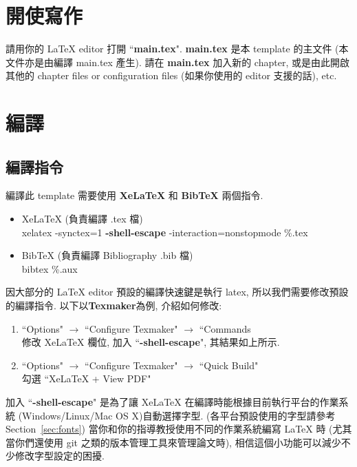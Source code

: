 \section{開使寫作}

請用你的 LaTeX editor 打開 ``\textbf{main.tex}".
\textbf{main.tex} 是本 template 的主文件 (本文件亦是由編譯 main.tex 產生).
請在 \textbf{main.tex} 加入新的 chapter, 或是由此開啟其他的 chapter files or configuration files (如果你使用的 editor 支援的話), etc.

\section{編譯}

\subsection{編譯指令}

編譯此 template 需要使用 \textbf{XeLaTeX} 和 \textbf{BibTeX} 兩個指令.

\begin{itemize}
\item XeLaTeX (負責編譯 .tex 檔)\\
xelatex -synctex=1 \textbf{-shell-escape} -interaction=nonstopmode \%.tex
\item BibTeX (負責編譯 Bibliography .bib 檔)\\
bibtex \%.aux
\end{itemize}

因大部分的 LaTeX editor 預設的編譯快速鍵是執行 latex, 所以我們需要修改預設的編譯指令.
以下以\textbf{Texmaker}為例, 介紹如何修改:
\begin{enumerate}
\item ``Options" $\rightarrow$ ``Configure Texmaker" $\rightarrow$ ``Commands\\
修改 XeLaTeX 欄位, 加入 ``\textbf{-shell-escape}", 其結果如上所示.
\item ``Options" $\rightarrow$ ``Configure Texmaker" $\rightarrow$ ``Quick Build"\\
勾選 ``XeLaTeX + View PDF"

\end{enumerate}

加入 ``\textbf{-shell-escape}" 是為了讓 XeLaTeX 在編譯時能根據目前執行平台的作業系統 (Windows/Linux/Mac OS X)自動選擇字型.
(各平台預設使用的字型請參考 Section~\ref{sec:fonts})
當你和你的指導教授使用不同的作業系統編寫 LaTeX 時 (尤其當你們還使用 git 之類的版本管理工具來管理論文時), 相信這個小功能可以減少不少修改字型設定的困擾.

